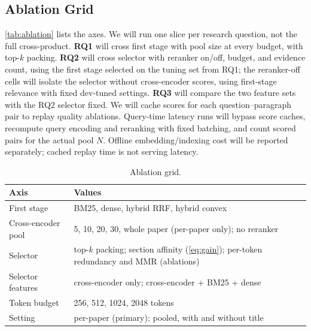 \documentclass[sigconf, nonacm]{acmart}
\begin{document}


\subsection{Ablation Grid}

\autoref{tab:ablation} lists the axes. We will run one slice per research question, not the full cross-product. \textbf{RQ1} will cross first stage with pool size at every budget, with top-$k$ packing. \textbf{RQ2} will cross selector with reranker on/off, budget, and evidence count, using the first stage selected on the tuning set from RQ1; the reranker-off cells will isolate the selector without cross-encoder scores, using first-stage relevance with fixed dev-tuned settings. \textbf{RQ3} will compare the two feature sets with the RQ2 selector fixed. We will cache scores for each question--paragraph pair to replay quality ablations. Query-time latency runs will bypass score caches, recompute query encoding and reranking with fixed batching, and count scored pairs for the actual pool $N$. Offline embedding/indexing cost will be reported separately; cached replay time is not serving latency.

\begin{table}[t]
  \caption{Ablation grid.}
  \label{tab:ablation}
  \footnotesize
  \begin{tabularx}{\columnwidth}{P{2.2cm}Y}
    \toprule
    Axis & Values \\
    \midrule
    First stage & BM25, dense, hybrid RRF, hybrid convex \\
    Cross-encoder pool & 5, 10, 20, 30, whole paper (per-paper only); no reranker \\
    Selector & top-$k$ packing; section affinity (\autoref{eq:gain}); per-token redundancy and MMR (ablations) \\
    Selector features & cross-encoder only; cross-encoder + BM25 + dense \\
    Token budget & 256, 512, 1024, 2048 tokens \\
    Setting & per-paper (primary); pooled, with and without title \\
    \bottomrule
  \end{tabularx}
\end{table}
\end{document}
